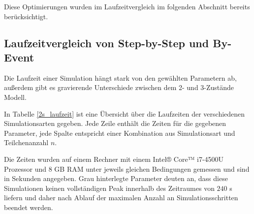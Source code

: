 Diese Optimierungen wurden im Laufzeitvergleich im folgenden Abschnitt bereits berücksichtigt.

\subsection{Laufzeitvergleich von Step-by-Step und By-Event}
\label{chapter:imp_laufzeit_sim}
Die Laufzeit einer Simulation hängt stark von den gewählten Parametern ab, außerdem gibt es gravierende Unterschiede zwischen dem 2- und 3-Zustände Modell.

In Tabelle \ref{2s_laufzeit} ist eine Übersicht über die Laufzeiten der verschiedenen Simulationsarten gegeben. 
Jede Zeile enthält die Zeiten für die gegebenen Parameter, jede Spalte entspricht einer Kombination aus Simulationsart und Teilchenanzahl $n$.

Die Zeiten wurden auf einem Rechner mit einem Intel® Core™ i7-4500U Prozessor und $8$ GB RAM 
unter jeweils gleichen Bedingungen gemessen und sind in Sekunden angegeben. %
Grau hinterlegte Parameter deuten an, dass diese Simulationen keinen vollständigen Peak innerhalb des Zeitraumes von $240$ s liefern und daher nach Ablauf der maximalen Anzahl an Simulationsschritten beendet werden.


